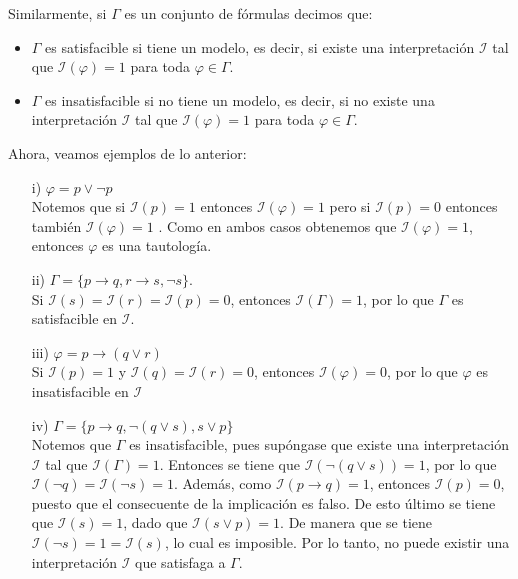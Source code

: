 \documentclass[letterpaper,11pt]{article}
\begin{document}
    Similarmente, si $\Gamma$ es un conjunto de fórmulas decimos que:
    \begin{itemize}
        \item $\Gamma$ es satisfacible si tiene un modelo, es decir, si existe
        una interpretación $\mathcal{I}$ tal que $\mathcal{I}(\varphi) = 1$
        para toda $\varphi \in \Gamma$.
        \item $\Gamma$ es insatisfacible si no tiene un modelo, es decir, si 
        no existe una interpretación $\mathcal{I}$ tal que 
        $\mathcal{I}(\varphi) = 1$ para toda $\varphi \in \Gamma$.
    \end{itemize}

    Ahora, veamos ejemplos de lo anterior: 
    \begin{itemize}
        \item[i)] $\varphi = p \lor \neg p$ \\
        Notemos que si $\mathcal{I}(p) = 1$ entonces $\mathcal{I}(\varphi) = 1$
        pero si $\mathcal{I}(p) = 0$ entonces también $\mathcal{I}(\varphi) = 1$
        . Como en ambos casos obtenemos que $\mathcal{I}(\varphi) = 1$, entonces 
        $\varphi$ es una tautología.
        \item[ii)] $\Gamma = \{ p \rightarrow q, r \rightarrow s, \neg s\}$.\\
        Si $\mathcal{I}(s) = \mathcal{I}(r) = \mathcal{I}(p) = 0$, entonces 
        $\mathcal{I}(\Gamma) = 1$, por lo que $\Gamma$ es satisfacible en 
        $\mathcal{I}$.
        \item[iii)] $\varphi = p \rightarrow (q \lor r)$ \\
        Si $\mathcal{I}(p) = 1$ y $\mathcal{I}(q) = \mathcal{I}(r) = 0$, 
        entonces $\mathcal{I}(\varphi) = 0$, por lo que $\varphi$ es 
        insatisfacible en $\mathcal{I}$
        \item[iv)] $\Gamma = \{ p \rightarrow q, \neg (q \lor s), s \lor p\}$\\
        Notemos que $\Gamma$ es insatisfacible, pues supóngase que existe una 
        interpretación $\mathcal{I}$ tal que $\mathcal{I}(\Gamma) = 1$. Entonces
        se tiene que $\mathcal{I}(\neg (q \lor s)) = 1$, por lo que 
        $\mathcal{I}(\neg q) = \mathcal{I}(\neg s) = 1$. Además, como 
        $\mathcal{I}(p \rightarrow q) = 1$, entonces $\mathcal{I}(p) = 0$,
        puesto que el consecuente de la implicación es falso. De esto último 
        se tiene que $\mathcal{I}(s) = 1$, dado que $\mathcal{I}(s \lor p) = 1$.
        De manera que se tiene $\mathcal{I}(\neg s) = 1 = \mathcal{I}(s)$, lo 
        cual es imposible. Por lo tanto, no puede existir una interpretación
        $\mathcal{I}$ que satisfaga a $\Gamma$.
    \end{itemize}
\end{document}
